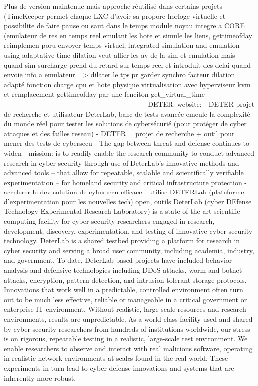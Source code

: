 Plus de version maintenue mais approche réutilisé dans certains projets (TimeKeeper permet chaque LXC d'avoir sa propore horloge virtuelle et possibilite de faire pause ou saut dans le temps module noyau integre a CORE (emulateur de res en temps reel emulant les hote et simule les liens, gettimeofday reimplemen poru envoyer temps virtuel, Integrated simulation and emulation using adaptative time dilation veut allier les av de la sim et emulation mais quand sim surcharge  prend du retard sur temps reel et introduit des delai quand envoie info a emulateur => dilater le tps pr garder synchro facteur dilation adapté fonction charge cpu et hote physique virtualisation avec hyperviseur kvm et remplacement gettimeofday par une fonciton get_virtual_time
-------------------------------------------------------------
DETER:
website:
- DETER projet de recherche et utilisateur DeterLab, banc de tests avancée emeule la complexité du monde réel pour tester les solutions de cybersécurié (pour protéger de cyber attaques et des failles reseau)
- DETER = projet de recherche + outil pour mener des tests de cybersecu
- The gap between threat and defense continues to widen
- mission: is to readily enable the research community to conduct advanced research in cyber security through use of DeterLab's innovative methods and advanced tools -- that allow for repeatable, scalable and scientifically verifiable experimentation -- for homeland security and critical infrastructure protection
- accelerer le dev solution de cybersecu efficace
- utilise DETERLab (plateforme d'experimentation pour les nouvelles tech) open, outils
DeterLab (cyber DEfense Technology Experimental Research Laboratory) is a state-of-the-art scientific computing facility for cyber-security researchers engaged in research, development, discovery, experimentation, and testing of innovative cyber-security technology. DeterLab is a shared testbed providing a platform for research in cyber security and serving a broad user community, including academia, industry, and government. To date, DeterLab-based projects have included behavior analysis and defensive technologies including DDoS attacks, worm and botnet attacks, encryption, pattern detection, and intrusion-tolerant storage protocols.
Innovations that work well in a predictable, controlled environment often turn out to be much less effective, reliable or manageable in a critical government or enterprise IT environment. Without realistic, large-scale resources and research environments, results are unpredictable. As a world-class facility used and shared by cyber security researchers from hundreds of institutions worldwide, our stress is on rigorous, repeatable testing in a realistic, large-scale test environment. We enable researchers to observe and interact with real malicious software, operating in realistic network environments at scales found in the real world. These experiments in turn lead to cyber-defense innovations and systems that are inherently more robust.
